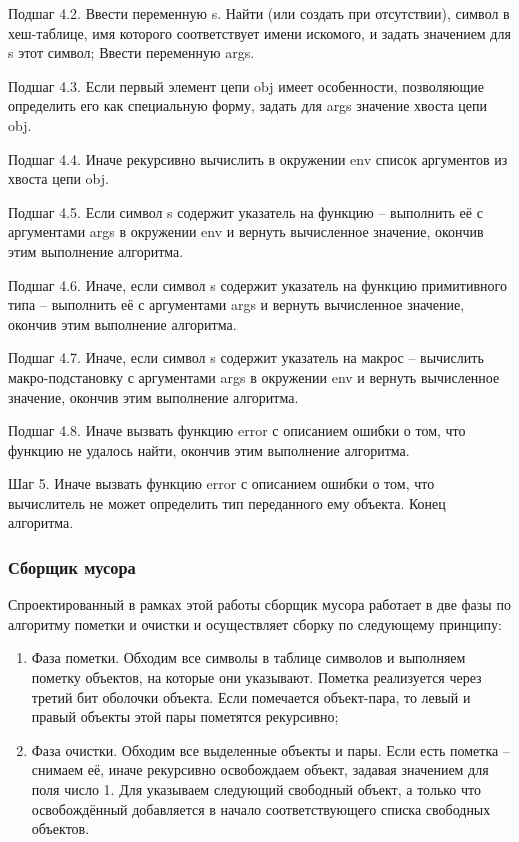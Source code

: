 Подшаг 4.2. Ввести переменную s. Найти (или создать при отсутствии), символ в хеш-таблице, имя которого соответствует имени искомого, и задать значением для s этот символ; Ввести переменную args.

Подшаг 4.3. Если первый элемент цепи obj имеет особенности, позволяющие определить его как специальную форму, задать для args значение хвоста цепи obj.

Подшаг 4.4. Иначе рекурсивно вычислить в окружении env список аргументов из хвоста цепи obj.

Подшаг 4.5. Если символ s содержит указатель на функцию -- выполнить её с аргументами args в окружении env и вернуть вычисленное значение, окончив этим выполнение алгоритма.

Подшаг 4.6. Иначе, если символ s содержит указатель на функцию примитивного типа -- выполнить её с аргументами args и вернуть вычисленное значение, окончив этим выполнение алгоритма.

Подшаг 4.7. Иначе, если символ s содержит указатель на макрос -- вычислить макро-подстановку с аргументами args в окружении env и вернуть вычисленное значение, окончив этим выполнение алгоритма.

Подшаг 4.8. Иначе вызвать функцию error с описанием ошибки о том, что функцию не удалось найти, окончив этим выполнение алгоритма.

Шаг 5. Иначе вызвать функцию error с описанием ошибки о том, что вычислитель не может определить тип переданного ему объекта. Конец алгоритма.

\subsubsection{Сборщик мусора}
Спроектированный в рамках этой работы сборщик мусора работает в две фазы по алгоритму пометки и очистки и осуществляет сборку по следующему принципу:

\begin{enumerate}
	\item Фаза пометки.
	Обходим все символы в таблице символов и выполняем пометку объектов, на которые они указывают. Пометка реализуется через третий бит оболочки объекта. Если помечается объект-пара, то левый и правый объекты этой пары пометятся рекурсивно;
	
	\item Фаза очистки.
	Обходим все выделенные объекты и пары. Если есть пометка -- снимаем её, иначе рекурсивно освобождаем объект, задавая значением для поля  число 1. Для  указываем следующий свободный объект, а только что освобождённый добавляется в начало соответствующего списка свободных объектов.
	
\end{enumerate}

